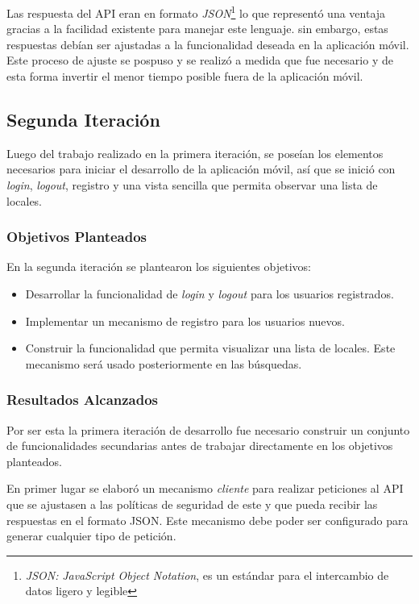 Las respuesta del API eran en formato \textit{JSON}\footnote{\textit{JSON:} \textit{JavaScript Object Notation}, es un estándar para el intercambio de datos ligero y legible\cite{JSON}} lo que representó una ventaja gracias a la facilidad existente  para manejar este lenguaje. sin embargo, estas respuestas debían ser ajustadas a la funcionalidad deseada en la aplicación móvil. Este proceso de ajuste se pospuso y se realizó a medida que fue necesario y de esta forma invertir el menor tiempo posible fuera de la aplicación móvil.

\subsection{Segunda Iteración}

Luego del trabajo realizado en la primera iteración, se poseían los elementos necesarios para iniciar el desarrollo de la aplicación móvil, así que se inició con \textit{login}, \textit{logout}, registro y una vista sencilla que permita observar una lista de locales.

\subsubsection{Objetivos Planteados}
En la segunda iteración se plantearon los siguientes objetivos:
\begin{itemize}
\item Desarrollar la funcionalidad de \textit{login} y \textit{logout} para los usuarios registrados.
\item Implementar un mecanismo de registro para los usuarios nuevos.
\item Construir la funcionalidad que permita visualizar una lista de locales. Este mecanismo será usado posteriormente en las búsquedas. 
\end{itemize}


\subsubsection{Resultados Alcanzados}

Por ser esta la primera iteración de desarrollo fue necesario construir un conjunto de funcionalidades secundarias antes de trabajar directamente en los objetivos planteados.

En primer lugar se elaboró un mecanismo \textit{cliente} para realizar peticiones al API que se ajustasen a las políticas de seguridad de este y que pueda recibir las respuestas en el formato JSON. Este mecanismo debe poder ser configurado para generar cualquier tipo de petición.


